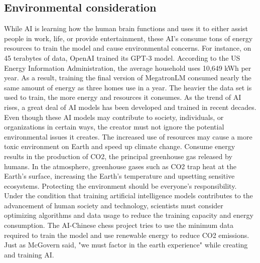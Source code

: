 \documentclass[10pt,twocolumn]{article}
\begin{document}
\subsection{Environmental consideration}
    While AI is learning how the human brain functions and uses it to either assist people in work, life, or provide entertainment, these AI's consume tons of energy resources to train the model and cause environmental concerns. For instance, on 45 terabytes of data, OpenAI trained its GPT-3 model. According to the US Energy Information Administration, the average household uses 10,649 kWh per year. As a result, training the final version of MegatronLM consumed nearly the same amount of energy as three homes use in a year\cite{EnergyConsumption}. The heavier the data set is used to train, the more energy and resources it consumes. As the trend of AI rises, a great deal of AI models has been developed and trained in recent decades. Even though these AI models may contribute to society, individuals, or organizations in certain ways, the creator must not ignore the potential environmental issues it creates. The increased use of resources may cause a more toxic environment on Earth and speed up climate change. Consume energy results in the production of CO2, the principal greenhouse gas released by humans. In the atmosphere, greenhouse gases such as CO2 trap heat at the Earth's surface, increasing the Earth's temperature and upsetting sensitive ecosystems. Protecting the environment should be everyone's responsibility. Under the condition that training artificial intelligence models contributes to the advancement of human society and technology, scientists must consider optimizing algorithms and data usage to reduce the training capacity and energy consumption. The AI-Chinese chess project tries to use the minimum data required to train the model and use renewable energy to reduce CO2 emissions. Just as McGovern said, "we must factor in the earth experience" while creating and training AI.  







\printbibliography 
\end{document}
